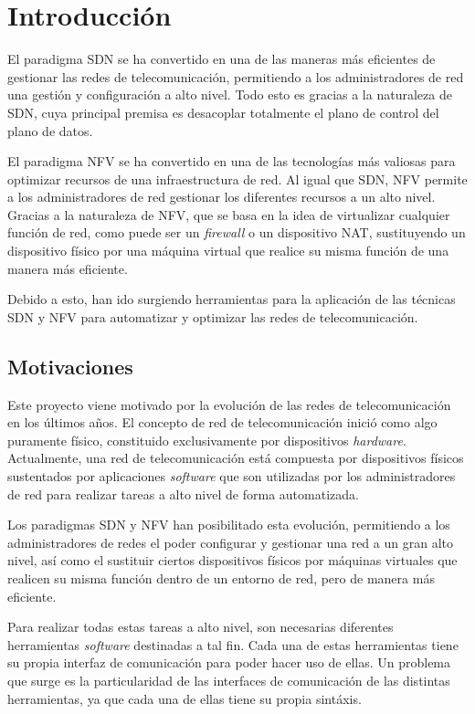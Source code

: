 \chapter{Introducción}

El paradigma \ac{SDN} se ha convertido en una de las maneras más eficientes de gestionar las redes de telecomunicación, permitiendo a los administradores de red una gestión y configuración a alto nivel. Todo esto es gracias a la naturaleza de \ac{SDN}, cuya principal premisa es desacoplar totalmente el plano de control del plano de datos.

El paradigma \ac{NFV} se ha convertido en una de las tecnologías más valiosas para optimizar recursos de una infraestructura de red. Al igual que \ac{SDN}, \ac{NFV} permite a los administradores de red gestionar los diferentes recursos a un alto nivel. Gracias a la naturaleza de NFV, que se basa en la idea de virtualizar cualquier función de red, como puede ser un \textit{firewall} o un dispositivo \ac{NAT}, sustituyendo un dispositivo físico por una máquina virtual que realice su misma función de una manera más eficiente.

Debido a esto, han ido surgiendo herramientas para la aplicación de las técnicas \ac{SDN} y \ac{NFV} para automatizar y optimizar las redes de telecomunicación.

\section{Motivaciones}

Este proyecto viene motivado por la evolución de las redes de telecomunicación en los últimos años. El concepto de red de telecomunicación inició como algo puramente físico, constituido exclusivamente por dispositivos \textit{hardware}. Actualmente, una red de telecomunicación está compuesta por dispositivos físicos sustentados por aplicaciones \textit{software} que son utilizadas por los administradores de red para realizar tareas a alto nivel de forma automatizada.

Los paradigmas \ac{SDN} y \ac{NFV} han posibilitado esta evolución, permitiendo a los administradores de redes el poder configurar y gestionar una red a un gran alto nivel, así como el sustituir ciertos dispositivos físicos por máquinas virtuales que realicen su misma función dentro de un entorno de red, pero de manera más eficiente.

Para realizar todas estas tareas a alto nivel, son necesarias diferentes herramientas \textit{software} destinadas a tal fin. Cada una de estas herramientas tiene su propia interfaz de comunicación para poder hacer uso de ellas. Un problema que surge es la particularidad de las interfaces de comunicación de las distintas herramientas, ya que cada una de ellas tiene su propia sintáxis.

